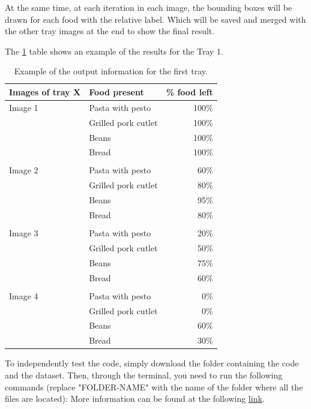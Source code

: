 \documentclass[
	a4paper, %
	10pt, %
	unnumberedsections, %
	twoside, %
]{LTJournalArticle}
\begin{document}
At the same time, at each iteration in each image, the bounding boxes will be drawn for each food with the relative label. Which will be saved and merged with the other tray images at the end to show the final result.

The \ref{tab:percentage} table shows an example of the results for the Tray 1. \\

\begin{table} %
	\caption{Example of the output information for the first tray.}
	\centering
	\begin{tabular}{l l r}
		\toprule
		Images of tray X & Food present & \% food left \\
		\midrule
        Image 1 & Pasta with pesto & 100\% \\
                      & Grilled pork cutlet & 100\% \\
                      & Beans & 100\% \\
                      & Bread & 100\% \\
        \\
        Image 2 & Pasta with pesto & 60\% \\
                      & Grilled pork cutlet & 80\% \\
                      & Beans & 95\% \\
                      & Bread & 80\% \\
        \\
        Image 3 & Pasta with pesto & 20\% \\
                      & Grilled pork cutlet & 50\% \\
                      & Beans & 75\% \\
                      & Bread & 60\% \\
        \\
        Image 4 & Pasta with pesto & 0\% \\
                      & Grilled pork cutlet & 0\% \\
                      & Beans & 60\% \\
                      & Bread & 30\% \\
		\bottomrule
	\end{tabular}
	\label{tab:percentage}
\end{table}



To independently test the code, simply download the folder containing the code and the dataset. Then, through the terminal, you need to run the following commands (replace "FOLDER-NAME" with the name of the folder where all the files are located):
More information can be found at the following \href{https://github.com/Piero24/Food-recognition-and-leftover-estimation}{link}.
\end{document}
